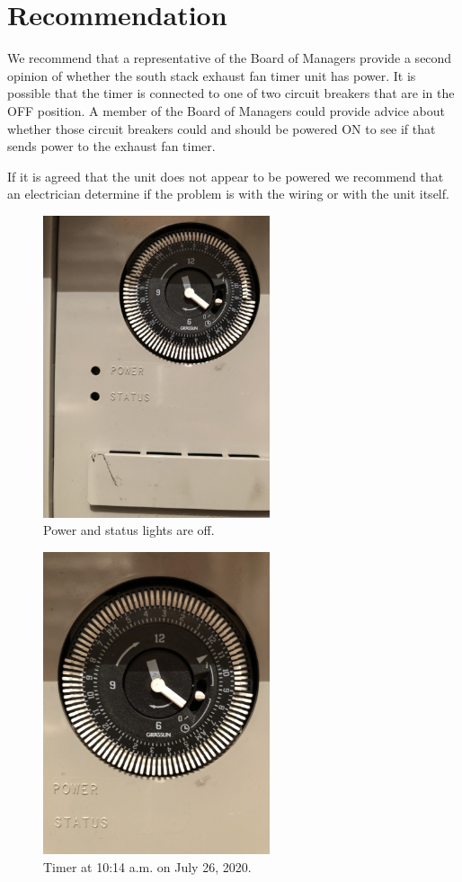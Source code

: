 \documentclass[letterpaper,12pt]{texMemo}
\begin{document}
\section{Recommendation}

We recommend that a representative of the Board of Managers provide a
second opinion of whether the south stack exhaust fan timer unit has
power. It is possible that the timer is connected to one of two circuit breakers
that are in the OFF position. A member of the Board of Managers could 
provide advice about whether those circuit breakers could and should be
powered ON to see if that sends power to the exhaust fan timer.

If it is agreed that the unit does not appear to be powered we
recommend that an electrician determine if the problem is with the wiring
or with the unit itself.

\begin{figure}
  \includegraphics[width=\linewidth,angle=-90,origin=c,height=3.5in]{images/power-status.jpg}
  \caption{Power and status lights are off.}
  \label{Figure 1}
\end{figure}

\begin{figure}
  \includegraphics[width=\linewidth,angle=-90,origin=c,height=3.5in]{images/20200726T1014.jpg}
  \caption{Timer at 10:14 a.m. on July 26, 2020.}
  \label{Figure 2}
\end{figure}
\end{document}
